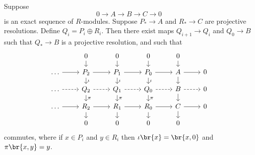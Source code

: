 \begin{proposition}
Suppose
$$ 0 \to A \to B \to C \to 0 $$
is an exact sequence of $ R $-modules. Suppose $ P_* \to A $ and $ R_* \to C $ are projective resolutions. Define $ Q_i = P_i \oplus R_i $. Then there exist maps $ Q_{i + 1} \to Q_i $ and $ Q_0 \to B $ such that $ Q_* \to B $ is a projective resolution, and such that
$$
\begin{tikzcd}[row sep=small]
& 0 \arrow{d} & 0 \arrow{d} & 0 \arrow{d} & 0 \arrow{d} & \\
\dots \arrow{r} & P_2 \arrow{r} \arrow{d}{\iota} & P_1 \arrow{r} \arrow{d}{\iota} & P_0 \arrow{r} \arrow{d}{\iota} & A \arrow{r} \arrow{d} & 0 \\
\dots \arrow[dashed]{r} & Q_2 \arrow[dashed]{r} \arrow{d}{\pi} & Q_1 \arrow[dashed]{r} \arrow{d}{\pi} & Q_0 \arrow[dashed]{r} \arrow{d}{\pi} & B \arrow[dashed]{r} \arrow{d} & 0 \\
\dots \arrow{r} & R_2 \arrow{r} \arrow{d} & R_1 \arrow{r} \arrow{d} & R_0 \arrow{r} \arrow{d} & C \arrow{r} \arrow{d} & 0 \\
& 0 & 0 & 0 & 0 &
\end{tikzcd}
$$
commutes, where if $ x \in P_i $ and $ y \in R_i $ then $ \iota\br{x} = \br{x, 0} $ and $ \pi\br{x, y} = y $.
\end{proposition}

\pagebreak

